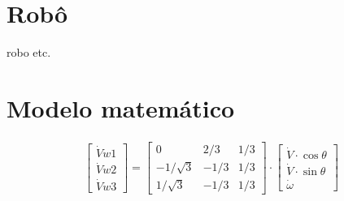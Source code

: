 
\section{Robô}
robo etc.

\section{Modelo matemático}

\begin{gather}
	\begin{bmatrix} \dot{V}{w1} \\  \dot{V}{w2} \\  \dot{V}{w3} \end{bmatrix}
	=
	\begin{bmatrix}
		0 & 2/3 & 1/3 \\
		-1/\sqrt{3} & -1/3 & 1/3\\
		1/\sqrt{3} & -1/3 & 1/3
	\end{bmatrix}
	\cdot
	\begin{bmatrix} \dot{V}\cdot \cos{\theta} \\  \dot{V}\cdot \sin{\theta} \\  \dot{\omega} \end{bmatrix}
   \end{gather}